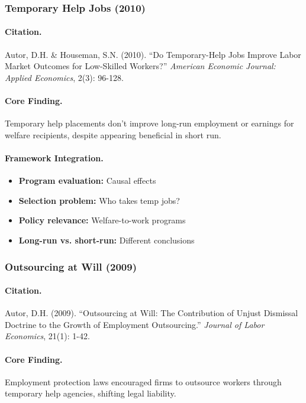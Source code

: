 \subsubsection{Temporary Help Jobs (2010)}

\paragraph{Citation.}
Autor, D.H. \& Houseman, S.N. (2010). ``Do Temporary-Help Jobs Improve
Labor Market Outcomes for Low-Skilled Workers?''
\emph{American Economic Journal: Applied Economics}, 2(3): 96-128.

\paragraph{Core Finding.}
Temporary help placements don't improve long-run employment or earnings
for welfare recipients, despite appearing beneficial in short run.

\paragraph{Framework Integration.}
\begin{itemize}
  \item \textbf{Program evaluation:} Causal effects
  \item \textbf{Selection problem:} Who takes temp jobs?
  \item \textbf{Policy relevance:} Welfare-to-work programs
  \item \textbf{Long-run vs. short-run:} Different conclusions
\end{itemize}

\subsubsection{Outsourcing at Will (2009)}

\paragraph{Citation.}
Autor, D.H. (2009). ``Outsourcing at Will: The Contribution of Unjust
Dismissal Doctrine to the Growth of Employment Outsourcing.''
\emph{Journal of Labor Economics}, 21(1): 1-42.

\paragraph{Core Finding.}
Employment protection laws encouraged firms to outsource workers through
temporary help agencies, shifting legal liability.

